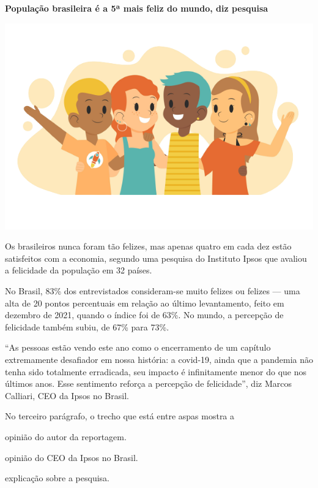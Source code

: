 \begin{conteudo}
\begin{conteudo}
\begin{conteudo}
\begin{conteudo}
\begin{conteudo}
\begin{myquote}
\textbf{População brasileira é a 5ª mais feliz do mundo, diz pesquisa}

\begin{center}
\includegraphics[width=.6\textwidth]{media/image28c.png}
\end{center}

Os brasileiros nunca foram tão felizes, mas apenas quatro em cada dez
estão satisfeitos com a economia, segundo uma pesquisa do Instituto
Ipsos que avaliou a felicidade da população em 32 países.

No Brasil, 83\% dos entrevistados consideram-se muito felizes ou felizes
--- uma alta de 20 pontos percentuais em relação ao último levantamento,
feito em dezembro de 2021, quando o índice foi de 63\%. No mundo, a
percepção de felicidade também subiu, de 67\% para 73\%.

``As pessoas estão vendo este ano como o encerramento de um capítulo
extremamente desafiador em nossa história: a covid-19, ainda que a
pandemia não tenha sido totalmente erradicada, seu impacto é
infinitamente menor do que nos últimos anos. Esse sentimento reforça a
percepção de felicidade'', diz Marcos Calliari, CEO da Ipsos no Brasil.

\end{myquote}

No terceiro parágrafo, o trecho que está entre aspas mostra a

\begin{escolha}
\item opinião do autor da reportagem.

\item opinião do CEO da Ipsos no Brasil.

\item explicação sobre a pesquisa.


\end{escolha}
\end{conteudo}
\end{conteudo}
\end{conteudo}
\end{conteudo}
\end{conteudo}
